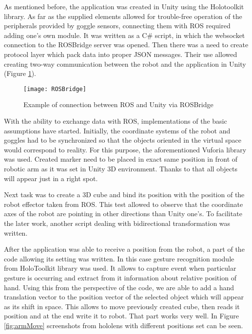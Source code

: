 \documentclass[printmode,en]{mgr}
\begin{document}
As mentioned before, the application was created in Unity using the Holotoolkit library. As far as the supplied elements allowed for trouble-free operation of the peripherals provided by goggle sensors, connecting them with ROS required adding one's own module. It was written as a C\# script, in which the websocket connection to the ROSBridge server was opened. Then there was a need to create protocol layer which pack data into proper JSON messages. Their use allowed creating two-way communication between the robot and the application in Unity (Figure \ref{fig:ROSBridge}).

\begin{figure}[!ht]
  \centering
    \texttt{[image: ROSBridge]}
  \caption{Example of connection between ROS and Unity via ROSBridge}
  \label{fig:ROSBridge}
\end{figure}

With the ability to exchange data with ROS, implementations of the basic assumptions have started. Initially, the coordinate systems of the robot and goggles had to be synchronized so that the objects oriented in the virtual space would correspond to reality. For this purpose, the aforementioned Vuforia library was used. Created marker need to be placed in exact same position in front of robotic arm as it was set in Unity 3D environment. Thanks to that all objects will appear just in a right spot.

Next task was to create a 3D cube and bind its position with the position of the robot effector taken from ROS. This test allowed to observe that the coordinate axes of the robot are pointing in other directions than Unity one's. To facilitate the later work, another script dealing with bidirectional transformation was written.

After the application was able to receive a position from the robot, a part of the code allowing its setting was written. In this case gesture recognition module from HoloToolkit library was used. It allows to capture event when particular gesture is occurring and extract from it information about relative position of hand. Using this from the perspective of the code, we are able to add a hand translation vector to the position vector of the selected object which will appear as its shift in space. This allows to move previously created cube, then reads it position and at the end write it to robot. That part works very well. In Figure \ref{fig:armMove} screenshots from hololens with different positions set can be seen.
\end{document}
